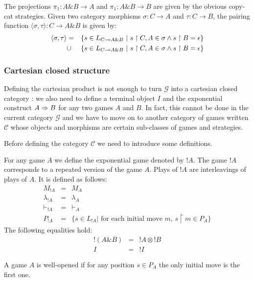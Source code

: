 The projections $\pi_1:A \& B \rightarrow A$ and $\pi_1:A \& B
\rightarrow B$ are given by the obvious copy-cat strategies. Given
two category morphisms $\sigma :C \rightarrow A$ and $\tau : C
\rightarrow B$, the pairing function $\langle \sigma, \tau \rangle :
C \rightarrow A \& B$ is given by:
\begin{eqnarray*}
\langle \sigma, \tau \rangle &=& \{ s \in L_{C\multimap A\&B} \ | \ s \upharpoonright C,A \in \sigma \wedge s \upharpoonright B = \epsilon  \} \\
&\cup& \{ s \in L_{C\multimap A\&B} \ | \ s \upharpoonright C,A \in \sigma \wedge s \upharpoonright B = \epsilon  \}
\end{eqnarray*}

\subsubsection{Cartesian closed structure}
Defining the cartesian product is not enough to turn $\mathcal{G}$
into a cartesian closed category : we also need to define a terminal
object $I$ and the exponential construct $A \Rightarrow B$ for any two
games $A$ and $B$. In fact, this cannot be done in the current
category $\mathcal{G}$ and we have to move on to another category of
games written $\mathcal{C}$ whose objects and morphisms are certain
sub-classes of games and strategies.

Before defining the category $\mathcal{C}$ we need to introduce some
definitions.


For any game $A$ we define the exponential game denoted by $!A$. The
game $!A$ corresponds to a repeated version of the game $A$. Plays
of $!A$ are interleavings of plays of $A$. It is defined as follows:
\begin{eqnarray*}
  M_{!A} &=& M_A \\
  \lambda_{!A} &=& \lambda_A \\
  \vdash_{!A} & = & \vdash_{A} \\
  P_{!A} & = & \{ s \in L_{!A} | \mbox{ for each initial move $m$, } s \upharpoonright m \in P_A \}
\end{eqnarray*}
The following equalities hold:
\begin{eqnarray*}
  !(A \& B) &=& !A \otimes !B\\
  I &=& !I
\end{eqnarray*}

\begin{dfn}
A game $A$ is well-opened if for any position $s \in P_A$ the only initial move is the first
one.
\end{dfn}

